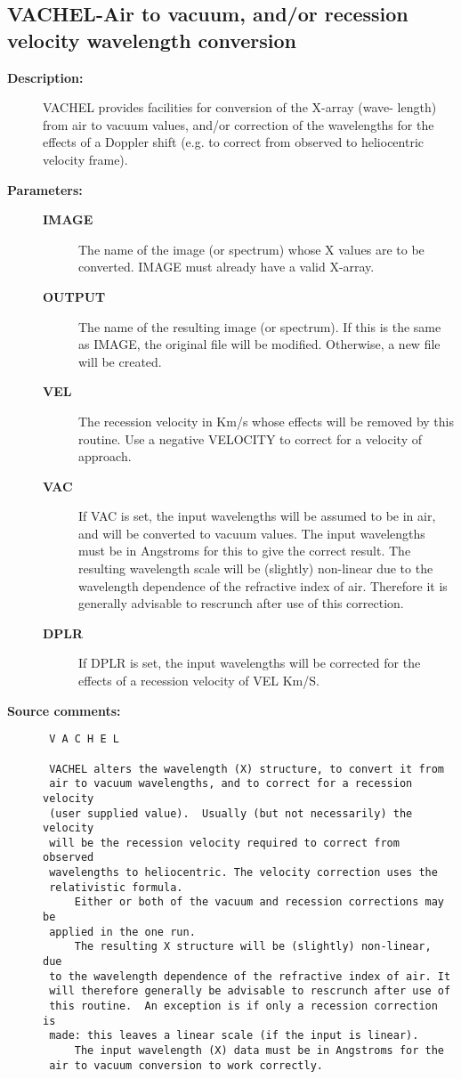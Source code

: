 \subsection{VACHEL-\label{VACHEL}Air to vacuum, and/or recession velocity wavelength conversion}
\begin{description}

\item [{\bf Description:}]
 VACHEL provides facilities for conversion of the X-array (wave-
 length) from air to vacuum values, and/or correction of the
 wavelengths for the effects of a Doppler shift (e.g. to correct
 from observed to heliocentric velocity frame).

\item [{\bf Parameters:}]
\begin{description}
\item [{\bf IMAGE}]
 The name of the image (or spectrum) whose
 X values are to be converted. IMAGE must already
 have a valid X-array.
\item [{\bf OUTPUT}]
 The name of the resulting image (or
 spectrum).  If this is the same as IMAGE, the
 original file will be modified.  Otherwise, a
 new file will be created.
\item [{\bf VEL}]
 The recession velocity in Km/s
 whose effects will be removed by this routine.
 Use a negative VELOCITY to correct for a
 velocity of approach.
\item [{\bf VAC}]
 If VAC is set, the input wavelengths will be assumed
 to be in air, and will be converted to vacuum values.
 The input wavelengths must be in Angstroms for this to
 give the correct result.  The resulting wavelength scale
 will be (slightly) non-linear due to the wavelength
 dependence of the refractive index of air.  Therefore it
 is generally advisable to rescrunch after use of this
 correction.
\item [{\bf DPLR}]
 If DPLR is set, the input wavelengths will be corrected
 for the effects of a recession velocity of VEL Km/S.
\end{description}

\item [{\bf Source comments:}]
\begin{verbatim}
 V A C H E L

 VACHEL alters the wavelength (X) structure, to convert it from
 air to vacuum wavelengths, and to correct for a recession velocity
 (user supplied value).  Usually (but not necessarily) the velocity
 will be the recession velocity required to correct from observed
 wavelengths to heliocentric. The velocity correction uses the
 relativistic formula.
     Either or both of the vacuum and recession corrections may be
 applied in the one run.
     The resulting X structure will be (slightly) non-linear, due
 to the wavelength dependence of the refractive index of air. It
 will therefore generally be advisable to rescrunch after use of
 this routine.  An exception is if only a recession correction is
 made: this leaves a linear scale (if the input is linear).
     The input wavelength (X) data must be in Angstroms for the
 air to vacuum conversion to work correctly.



\end{verbatim}
\end{description}
